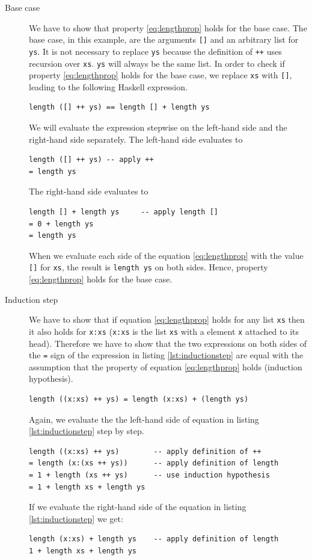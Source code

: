 \begin{description}
\item[Base case]
We have to show that property \ref{eq:lengthprop} holds for the base case. The base case, in this example, are the arguments \verb|[]| and an arbitrary list for \verb|ys|. It is not necessary to replace \verb|ys| because the definition of \verb|++| uses recursion over \verb|xs|. \verb|ys| will always be the same list.
In order to check if property \ref{eq:lengthprop} holds for the base case, we replace \verb|xs| with  \verb|[]|, leading to the following Haskell expression.

\begin{verbatim}
length ([] ++ ys) == length [] + length ys
\end{verbatim}

We will evaluate the expression stepwise on the left-hand side and the right-hand side separately.
The left-hand side evaluates to

\begin{verbatim}
length ([] ++ ys) -- apply ++
= length ys
\end{verbatim}

The right-hand side evaluates to 

\begin{verbatim}
length [] + length ys     -- apply length []
= 0 + length ys
= length ys
\end{verbatim}

When we evaluate each side of the equation \ref{eq:lengthprop} with the value \verb|[]| for \verb|xs|, the result is \verb|length ys| on both sides. Hence, property \ref{eq:lengthprop} holds for the base case.

\item[Induction step]
We have to show that if equation \ref{eq:lengthprop} holds for any list \verb|xs| then it also holds for \verb|x:xs| (\verb|x:xs| is the list \verb|xs| with a  element \verb|x| attached to its head). Therefore we have to show that the two expressions on both sides of the \verb|=| sign of the  expression in listing \ref{lst:inductionstep} are equal with the assumption that the property of equation \ref{eq:lengthprop} holds (induction hypothesis).
\begin{lstlisting}[caption={Equality expression for induction step},label={lst:inductionstep}]
length ((x:xs) ++ ys) = length (x:xs) + (length ys)
\end{lstlisting}
Again, we evaluate the the left-hand side of equation in listing \ref{lst:inductionstep} step by step.
\begin{verbatim}
length ((x:xs) ++ ys)        -- apply definition of ++
= length (x:(xs ++ ys))      -- apply definition of length
= 1 + length (xs ++ ys)      -- use induction hypothesis
= 1 + length xs + length ys
\end{verbatim}
If we evaluate the right-hand side of the equation in listing \ref{lst:inductionstep} we get:
\begin{verbatim}
length (x:xs) + length ys    -- apply definition of length
1 + length xs + length ys
\end{verbatim}


\end{description}
